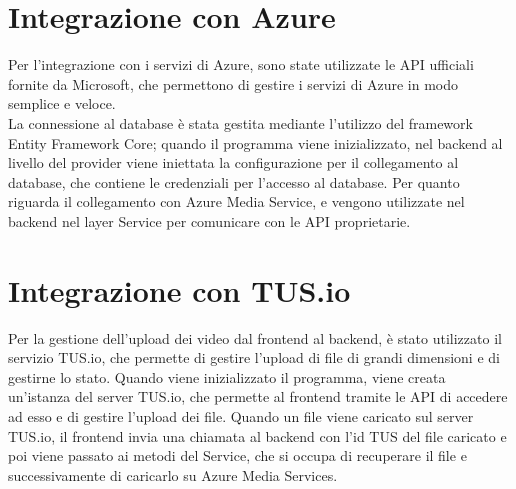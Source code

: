 \section{Integrazione con Azure}
Per l'integrazione con i servizi di Azure, sono state utilizzate le API ufficiali fornite da Microsoft, che permettono di gestire i servizi di Azure in modo semplice e veloce.\\
La connessione al database è stata gestita mediante l'utilizzo del framework Entity Framework Core; quando il programma viene inizializzato, nel backend al livello del provider viene iniettata la configurazione per il collegamento al database, che contiene le credenziali per l'accesso al database. Per quanto riguarda il collegamento con Azure Media Service, e vengono utilizzate nel backend nel layer Service per comunicare con le API proprietarie.

\section{Integrazione con TUS.io}
Per la gestione dell'upload dei video dal frontend al backend, è stato utilizzato il servizio TUS.io, che permette di gestire l'upload di file di grandi dimensioni e di gestirne lo stato. Quando viene inizializzato il programma, viene creata un'istanza del server TUS.io, che permette al frontend tramite le API di accedere ad esso e di gestire l'upload dei file. Quando un file viene caricato sul server TUS.io, il frontend invia una chiamata al backend con l'id TUS del file caricato e poi viene passato ai metodi del Service, che si occupa di recuperare il file e successivamente di caricarlo su Azure Media Services.\\
